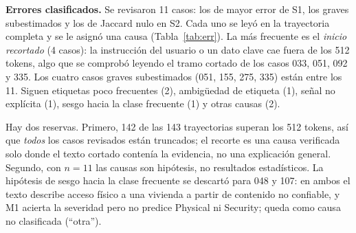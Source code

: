 \documentclass[conference]{IEEEtran}
\begin{document}
\textbf{Errores clasificados.} Se revisaron 11 casos: los de mayor error de S1, los graves subestimados y los de Jaccard nulo en S2. Cada uno se leyó en la trayectoria completa y se le asignó una causa (Tabla~\ref{tab:err}). La más frecuente es el \emph{inicio recortado} (4 casos): la instrucción del usuario o un dato clave cae fuera de los 512 tokens, algo que se comprobó leyendo el tramo cortado de los casos 033, 051, 092 y 335. Los cuatro casos graves subestimados (051, 155, 275, 335) están entre los 11. Siguen etiquetas poco frecuentes (2), ambigüedad de etiqueta (1), señal no explícita (1), sesgo hacia la clase frecuente (1) y otras causas (2).

Hay dos reservas. Primero, 142 de las 143 trayectorias superan los 512 tokens, así que \emph{todos} los casos revisados están truncados; el recorte es una causa verificada solo donde el texto cortado contenía la evidencia, no una explicación general. Segundo, con $n=11$ las causas son hipótesis, no resultados estadísticos. La hipótesis de sesgo hacia la clase frecuente se descartó para 048 y 107: en ambos el texto describe acceso físico a una vivienda a partir de contenido no confiable, y M1 acierta la severidad pero no predice Physical ni Security; queda como causa no clasificada (``otra'').
\end{document}
